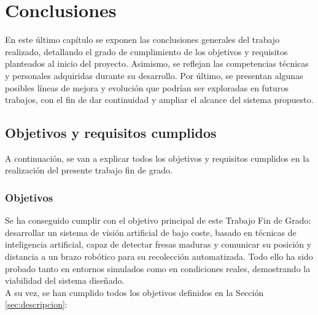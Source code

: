 \chapter{Conclusiones}
\label{cap:capitulo6}

En este último capítulo se exponen las conclusiones generales del trabajo realizado, detallando el grado de cumplimiento de los objetivos y requisitos planteados al inicio del proyecto. Asimismo, se reflejan las competencias técnicas y personales adquiridas durante su desarrollo. Por último, se presentan algunas posibles líneas de mejora y evolución que podrían ser exploradas en futuros trabajos, con el fin de dar continuidad y ampliar el alcance del sistema propuesto.

\section{Objetivos y requisitos cumplidos}
\label{sec:objetivos_y_requisitos}

A continuación, se van a explicar todos los objetivos y requisitos cumplidos en la realización del presente trabajo fin de grado.

\subsection{Objetivos}
\label{subsec:objetivos}

Se ha conseguido cumplir con el objetivo principal de este Trabajo Fin de Grado: desarrollar un sistema de visión artificial de bajo coste, basado en técnicas de inteligencia artificial, capaz de detectar fresas maduras y comunicar su posición y distancia a un brazo robótico para su recolección automatizada. Todo ello ha sido probado tanto en entornos simulados como en condiciones reales, demostrando la viabilidad del sistema diseñado.\\

A su vez, se han cumplido todos los objetivos definidos en la Sección \ref{sec:descripcion}:

